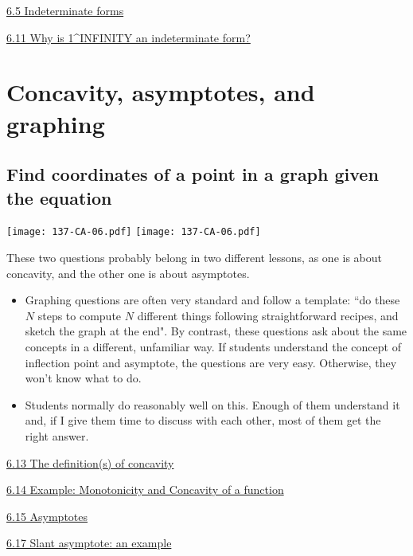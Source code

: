 \documentclass[11pt]{article}
\newcommand{\nl}{\hfill \vspace{-1.1\baselineskip}} %
\newcommand{\vv}{\hspace{8mm} \href{https://www.youtube.com/watch?v=yz8uZbi2wEk&list=PLlwePzQY_wW9EsqbQzPdJTNGsHYvO_2CJ&index=5}{6.5 Indeterminate forms}}
\newcommand{\vxi}{\hspace{8mm}\href{https://www.youtube.com/watch?v=I7LjiDDI7ZA&list=PLlwePzQY_wW9EsqbQzPdJTNGsHYvO_2CJ&index=11}{6.11 Why is 1\^{}INFINITY an indeterminate form?}}
\newcommand{\vxiii}{\hspace{8mm} \href{https://www.youtube.com/watch?v=4Dh6KdQDRkw&list=PLlwePzQY_wW9EsqbQzPdJTNGsHYvO_2CJ&index=13}{6.13 The definition(s) of concavity}}
\newcommand{\vxiv}{\hspace{8mm} \href{https://www.youtube.com/watch?v=ZodaIjLuhI8&list=PLlwePzQY_wW9EsqbQzPdJTNGsHYvO_2CJ&index=14}{6.14 Example: Monotonicity and Concavity of a function}}
\newcommand{\vxv}{\hspace{8mm} \href{https://www.youtube.com/watch?v=PG41kUSC0w0&list=PLlwePzQY_wW9EsqbQzPdJTNGsHYvO_2CJ&index=15}{6.15 Asymptotes}}
\newcommand{\vxvii}{\hspace{8mm} \href{https://www.youtube.com/watch?v=UTFOz-4GZYs&list=PLlwePzQY_wW9EsqbQzPdJTNGsHYvO_2CJ&index=17}{6.17 Slant asymptote: an example}}
\begin{document}
\begin{videos}
\vv

\vxi

\end{videos}

\newpage
\section{Concavity, asymptotes, and graphing}
\subsection{Find coordinates of a point in a graph given the equation}

\begin{center}
{ \texttt{[image: 137-CA-06.pdf]}} \quad
{ \texttt{[image: 137-CA-06.pdf]}} 
\end{center}

\begin{warning}
	These two questions probably belong in two different lessons, as one is about concavity, and the other one is about asymptotes.
\end{warning}

\begin{comments}
\nl
	\begin{itemize}
		\item  Graphing questions are often very standard and follow a template: ``do these $N$ steps to compute $N$ different things following straightforward recipes, and sketch the graph at the end".   By contrast, these questions ask about the same concepts in a different, unfamiliar way.  If students understand the concept of inflection point and asymptote, the questions are very easy.  Otherwise, they won't know what to do.
		\item Students normally do reasonably well on this.  Enough of them understand it and, if I give them time to discuss with each other, most of them get the right answer.
	\end{itemize}
\end{comments}

\begin{videos}
\vxiii

\vxiv

\vxv

\vxvii
\end{videos}

\newpage
\end{document}
